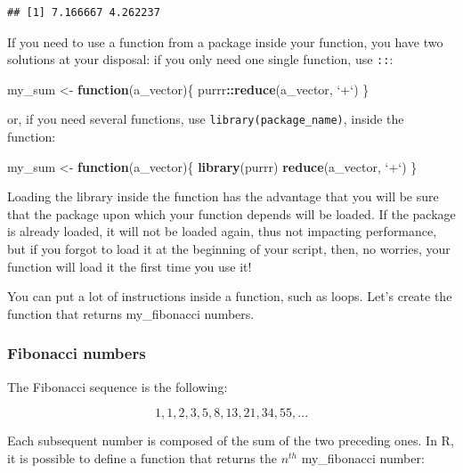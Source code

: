 \documentclass[]{gitbook}
\newenvironment{Shaded}{\begin{snugshade}}{\end{snugshade}}
\newcommand{\ControlFlowTok}[1]{\textcolor[rgb]{0.13,0.29,0.53}{\textbf{#1}}}
\newcommand{\DataTypeTok}[1]{\textcolor[rgb]{0.13,0.29,0.53}{#1}}
\newcommand{\KeywordTok}[1]{\textcolor[rgb]{0.13,0.29,0.53}{\textbf{#1}}}
\newcommand{\NormalTok}[1]{#1}
\newcommand{\OperatorTok}[1]{\textcolor[rgb]{0.81,0.36,0.00}{\textbf{#1}}}
\newcommand{\StringTok}[1]{\textcolor[rgb]{0.31,0.60,0.02}{#1}}
\theoremstyle{definition}
\theoremstyle{definition}
\theoremstyle{definition}
\theoremstyle{remark}
\begin{document}
\begin{verbatim}
## [1] 7.166667 4.262237
\end{verbatim}

If you need to use a function from a package inside your function, you
have two solutions at your disposal: if you only need one single
function, use \texttt{::}:

\begin{Shaded}
\begin{Highlighting}[]
\NormalTok{my_sum <-}\StringTok{ }\ControlFlowTok{function}\NormalTok{(a_vector)\{}
\NormalTok{  purrr}\OperatorTok{::}\KeywordTok{reduce}\NormalTok{(a_vector, }\StringTok{`}\DataTypeTok{+}\StringTok{`}\NormalTok{)}
\NormalTok{\}}
\end{Highlighting}
\end{Shaded}

or, if you need several functions, use \texttt{library(package\_name)},
inside the function:

\begin{Shaded}
\begin{Highlighting}[]
\NormalTok{my_sum <-}\StringTok{ }\ControlFlowTok{function}\NormalTok{(a_vector)\{}
  \KeywordTok{library}\NormalTok{(purrr)}
  \KeywordTok{reduce}\NormalTok{(a_vector, }\StringTok{`}\DataTypeTok{+}\StringTok{`}\NormalTok{)}
\NormalTok{\}}
\end{Highlighting}
\end{Shaded}

Loading the library inside the function has the advantage that you will
be sure that the package upon which your function depends will be
loaded. If the package is already loaded, it will not be loaded again,
thus not impacting performance, but if you forgot to load it at the
beginning of your script, then, no worries, your function will load it
the first time you use it!

You can put a lot of instructions inside a function, such as loops.
Let's create the function that returns my\_fibonacci numbers.

\hypertarget{fibonacci-numbers}{%
\subsubsection{Fibonacci numbers}\label{fibonacci-numbers}}

The Fibonacci sequence is the following:

\[1, 1, 2, 3, 5, 8, 13, 21, 34, 55, ...\]

Each subsequent number is composed of the sum of the two preceding ones.
In R, it is possible to define a function that returns the \(n^{th}\)
my\_fibonacci number:
\end{document}
